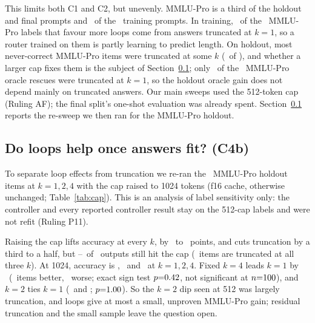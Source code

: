 \documentclass[11pt]{article}
\begin{document}
This limits both C1 and C2, but unevenly. MMLU-Pro is a third of the holdout and final prompts and \TrainMmluKOneN\ of the \TrainN\ training prompts. In training, \TrainMmluRescuedTruncOne\ of the \TrainMmluRescued\ MMLU-Pro labels that favour more loops come from answers truncated at $k{=}1$, so a router trained on them is partly learning to predict length. On holdout, most never-correct MMLU-Pro items were truncated at some $k$ (\HoldoutMmluNoneTrunc\ of \HoldoutMmluNone), and whether a larger cap fixes them is the subject of Section~\ref{sec:c4b}; only \HoldoutMmluRescuedTruncOne\ of the \HoldoutMmluRescued\ MMLU-Pro oracle rescues were truncated at $k{=}1$, so the holdout oracle gain does not depend mainly on truncated answers. Our main sweeps used the 512-token cap (Ruling AF); the final split's one-shot evaluation was already spent. Section~\ref{sec:c4b} reports the re-sweep we then ran for the MMLU-Pro holdout.

\subsection{Do loops help once answers fit? (C4b)}
\label{sec:c4b}
To separate loop effects from truncation we re-ran the \MmluCapN\ MMLU-Pro holdout items at $k{=}1,2,4$ with the cap raised to 1024 tokens (f16 cache, otherwise unchanged; Table~\ref{tab:cap}). This is an analysis of label sensitivity only: the controller and every reported controller result stay on the 512-cap labels and were not refit (Ruling P11).

Raising the cap lifts accuracy at every $k$, by \MmluCapLiftMin\ to \MmluCapLiftMax\ points, and cuts truncation by a third to a half, but \MmluCapOneTruncBigCap--\MmluCapTwoTruncBigCap\ of \MmluCapN\ outputs still hit the cap (\MmluCapSharedTrunc\ items are truncated at all three $k$). At 1024, accuracy is \MmluCapOneAccBigCap, \MmluCapTwoAccBigCap\ and \MmluCapFourAccBigCap\ at $k{=}1,2,4$. Fixed $k{=}4$ leads $k{=}1$ by \MmluCapFourLead\ (\MmluCapFourWins\ items better, \MmluCapFourLosses\ worse; exact sign test $p{=}0.42$, not significant at $n{=}\MmluCapN$), and $k{=}2$ ties $k{=}1$ (\MmluCapTwoWins\ and \MmluCapTwoLosses; $p{=}1.00$). So the $k{=}2$ dip seen at 512 was largely truncation, and loops give at most a small, unproven MMLU-Pro gain; residual truncation and the small sample leave the question open.

\begin{table}[t]
\centering
\small

\caption{MMLU-Pro holdout ($n{=}\MmluCapN$): correct and truncated item counts at the 512- and 1024-token caps, and items wrong and truncated at 512 that are right at 1024.}
\label{tab:cap}
\end{table}
\end{document}
